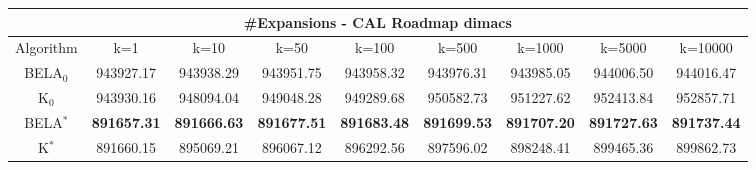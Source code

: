 \begin{tabular}{c|cccccccc}\toprule
\multicolumn{9}{c}{#Expansions - CAL Roadmap dimacs}\\ \midrule
Algorithm & k=1 & k=10 & k=50 & k=100 & k=500 & k=1000 & k=5000 & k=10000 \\ \midrule
BELA$_0$ & 943927.17 & 943938.29 & 943951.75 & 943958.32 & 943976.31 & 943985.05 & 944006.50 & 944016.47 \\
K$_0$ & 943930.16 & 948094.04 & 949048.28 & 949289.68 & 950582.73 & 951227.62 & 952413.84 & 952857.71 \\
BELA$^*$ & \textbf{891657.31} & \textbf{891666.63} & \textbf{891677.51} & \textbf{891683.48} & \textbf{891699.53} & \textbf{891707.20} & \textbf{891727.63} & \textbf{891737.44} \\
K$^*$ & 891660.15 & 895069.21 & 896067.12 & 896292.56 & 897596.02 & 898248.41 & 899465.36 & 899862.73 \\ \bottomrule 
\end{tabular}
